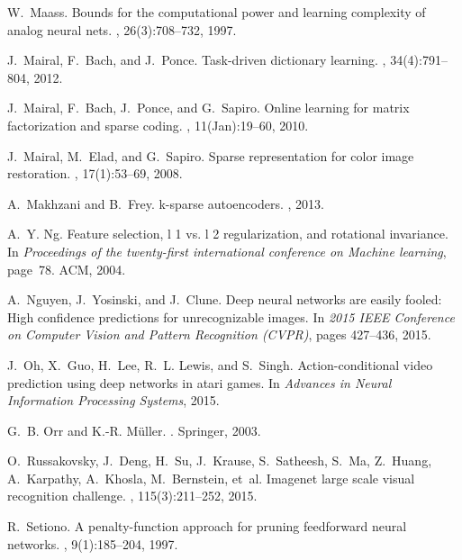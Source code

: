 \documentclass[10pt,twocolumn,letterpaper]{article}
\begin{document}
\begin{thebibliography}{10}
W.~Maass.
\newblock Bounds for the computational power and learning complexity of analog
  neural nets.
, 26(3):708--732, 1997.

J.~Mairal, F.~Bach, and J.~Ponce.
\newblock Task-driven dictionary learning.
,
  34(4):791--804, 2012.

J.~Mairal, F.~Bach, J.~Ponce, and G.~Sapiro.
\newblock Online learning for matrix factorization and sparse coding.
, 11(Jan):19--60, 2010.

J.~Mairal, M.~Elad, and G.~Sapiro.
\newblock Sparse representation for color image restoration.
, 17(1):53--69, 2008.

A.~Makhzani and B.~Frey.
\newblock k-sparse autoencoders.
, 2013.

A.~Y. Ng.
\newblock Feature selection, l 1 vs. l 2 regularization, and rotational
  invariance.
\newblock In {\em Proceedings of the twenty-first international conference on
  Machine learning}, page~78. ACM, 2004.

A.~Nguyen, J.~Yosinski, and J.~Clune.
\newblock Deep neural networks are easily fooled: High confidence predictions
  for unrecognizable images.
\newblock In {\em 2015 IEEE Conference on Computer Vision and Pattern
  Recognition (CVPR)}, pages 427--436, 2015.

J.~Oh, X.~Guo, H.~Lee, R.~L. Lewis, and S.~Singh.
\newblock Action-conditional video prediction using deep networks in atari
  games.
\newblock In {\em Advances in Neural Information Processing Systems}, 2015.

G.~B. Orr and K.-R. M{\"u}ller.
.
\newblock Springer, 2003.

O.~Russakovsky, J.~Deng, H.~Su, J.~Krause, S.~Satheesh, S.~Ma, Z.~Huang,
  A.~Karpathy, A.~Khosla, M.~Bernstein, et~al.
\newblock Imagenet large scale visual recognition challenge.
, 115(3):211--252,
  2015.

R.~Setiono.
\newblock A penalty-function approach for pruning feedforward neural networks.
, 9(1):185--204, 1997.


\end{thebibliography}
\end{document}

